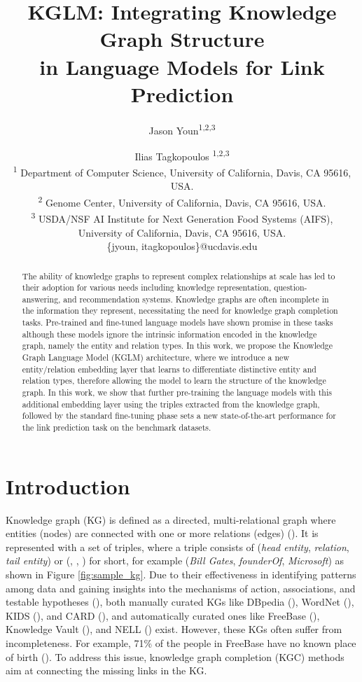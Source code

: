 \documentclass[11pt]{article}
\title{KGLM: Integrating Knowledge Graph Structure\\in Language Models for Link Prediction}
\author{
    Jason Youn\textsuperscript{\rm 1,2,3} \and Ilias Tagkopoulos \textsuperscript{\rm 1,2,3} \\
    \textsuperscript{\rm 1} Department of Computer Science, University of California, Davis, CA 95616, USA. \\ 
    \textsuperscript{\rm 2} Genome Center, University of California, Davis, CA 95616, USA. \\
    \textsuperscript{\rm 3} USDA/NSF AI Institute for Next Generation Food Systems (AIFS),\\University of California, Davis, CA 95616, USA. \\
    \{jyoun, itagkopoulos\}@ucdavis.edu
}
\begin{document}
\maketitle
\begin{abstract}
The ability of knowledge graphs to represent complex relationships at scale has led to their adoption for various needs including knowledge representation, question-answering, and recommendation systems. Knowledge graphs are often incomplete in the information they represent, necessitating the need for knowledge graph completion tasks. Pre-trained and fine-tuned language models have shown promise in these tasks although these models ignore the intrinsic information encoded in the knowledge graph, namely the entity and relation types. In this work, we propose the Knowledge Graph Language Model (KGLM) architecture, where we introduce a new entity/relation embedding layer that learns to differentiate distinctive entity and relation types, therefore allowing the model to learn the structure of the knowledge graph. In this work, we show that further pre-training the language models with this additional embedding layer using the triples extracted from the knowledge graph, followed by the standard fine-tuning phase sets a new state-of-the-art performance for the link prediction task on the benchmark datasets.
\end{abstract}

\section{Introduction}

Knowledge graph (KG) is defined as a directed, multi-relational graph where entities (nodes) are connected with one or more relations (edges) (\citealp{wang2017knowledge}). It is represented with a set of triples, where a triple consists of (\emph{head entity}, \emph{relation}, \emph{tail entity}) or (, , ) for short, for example (\emph{Bill Gates}, \emph{founderOf}, \emph{Microsoft}) as shown in Figure \ref{fig:sample_kg}. Due to their effectiveness in identifying patterns among data and gaining insights into the mechanisms of action, associations, and testable hypotheses (\citealp{li2014big, silvescu2012graph}), both manually curated KGs like DBpedia (\citealp{auer2007dbpedia}), WordNet (\citealp{miller1998wordnet}), KIDS (\citealp{youn2022knowledge}), and CARD (\citealp{alcock2020card}), and automatically curated ones like FreeBase (\citealp{bollacker2008freebase}), Knowledge Vault (\citealp{dong2014knowledge}), and NELL (\citealp{carlson2010toward}) exist. However, these KGs often suffer from incompleteness. For example, 71\% of the people in FreeBase have no known place of birth (\citealp{west2014knowledge}). To address this issue, knowledge graph completion (KGC) methods aim at connecting the missing links in the KG.
\end{document}

